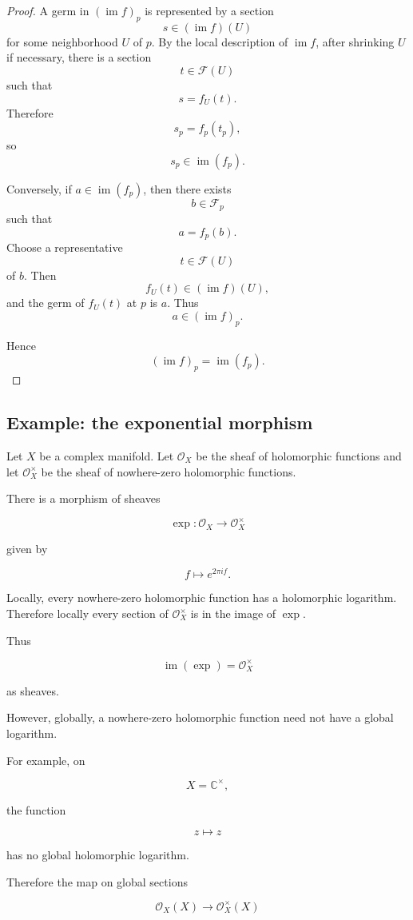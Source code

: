 \documentclass[12pt,a4paper]{article}
\DeclareMathOperator{\im}{im}
\theoremstyle{notespace}
\begin{document}
\begin{proof}
	A germ in $(\im f)_p$ is represented by a section
	\[
	s \in (\im f)(U)
	\]
	for some neighborhood $U$ of $p$.
	By the local description of $\im f$, after shrinking $U$ if necessary, there is
	a section
	\[
	t \in \mathcal F(U)
	\]
	such that
	\[
	s=f_U(t).
	\]
	Therefore
	\[
	s_p=f_p(t_p),
	\]
	so
	\[
	s_p \in \im(f_p).
	\]
	
	Conversely, if $a \in \im(f_p)$, then there exists
	\[
	b \in \mathcal F_p
	\]
	such that
	\[
	a=f_p(b).
	\]
	Choose a representative
	\[
	t \in \mathcal F(U)
	\]
	of $b$.
	Then
	\[
	f_U(t) \in (\im f)(U),
	\]
	and the germ of $f_U(t)$ at $p$ is $a$.
	Thus
	\[
	a \in (\im f)_p.
	\]
	
	Hence
	\[
	(\im f)_p=\im(f_p).
	\]
\end{proof}

\subsection{Example: the exponential morphism}
Let $X$ be a complex manifold.
Let $\mathcal O_X$ be the sheaf of holomorphic functions and let
$\mathcal O_X^\times$ be the sheaf of nowhere-zero holomorphic functions.

There is a morphism of sheaves

\[
\exp : \mathcal O_X \longrightarrow \mathcal O_X^\times
\]

given by

\[
f \longmapsto e^{2\pi i f}.
\]

Locally, every nowhere-zero holomorphic function has a holomorphic logarithm.
Therefore locally every section of $\mathcal O_X^\times$ is in the image of
$\exp$.

Thus

\[
\im(\exp)=\mathcal O_X^\times
\]

as sheaves.

However, globally, a nowhere-zero holomorphic function need not have a global
logarithm.

For example, on

\[
X=\mathbb C^\times,
\]

the function

\[
z \longmapsto z
\]

has no global holomorphic logarithm.

Therefore the map on global sections

\[
\mathcal O_X(X)
\longrightarrow
\mathcal O_X^\times(X)
\]
\end{document}
